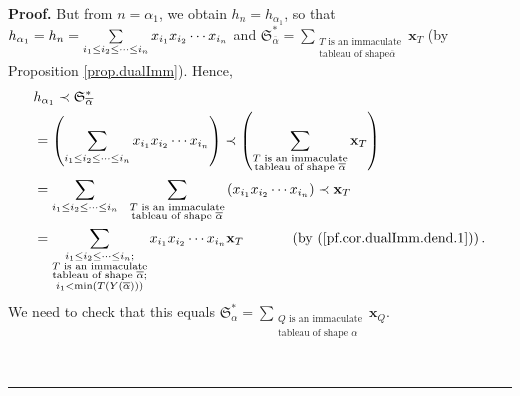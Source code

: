 \documentclass
[numbers=enddot,12pt,final,onecolumn,notitlepage,abstracton]{scrartcl}%
\theoremstyle{definition}
\newenvironment{proof}[1][Proof]{\noindent\textbf{#1.} }{\ \rule{0.5em}{0.5em}}
\newenvironment{vershort}{}{}
\let\sumnonlimits\sum
\renewcommand{\sum}{\sumnonlimits\limits}
\begin{document}
\begin{proof}
\begin{vershort}
But from $n=\alpha_{1}$, we obtain $h_{n}=h_{\alpha_{1}}$, so that
$h_{\alpha_{1}}=h_{n}=\sum\limits_{i_{1}\leq i_{2}\leq\cdots\leq i_{n}%
}x_{i_{1}}x_{i_{2}}\cdots x_{i_{n}}$ and $\mathfrak{S}_{\overline{\alpha}%
}^{\ast}=\sum_{\substack{T\text{ is an immaculate}\\\text{tableau of shape
}\overline{\alpha}}}\mathbf{x}_{T}$ (by Proposition \ref{prop.dualImm}).
Hence,%
\begin{align}
&  h_{\alpha_{1}}\left.  \prec\right.  \mathfrak{S}_{\overline{\alpha}}^{\ast
}\nonumber\\
&  =\left(  \sum\limits_{i_{1}\leq i_{2}\leq\cdots\leq i_{n}}x_{i_{1}}%
x_{i_{2}}\cdots x_{i_{n}}\right)  \left.  \prec\right.  \left(  \sum
_{\substack{T\text{ is an immaculate}\\\text{tableau of shape }\overline
{\alpha}}}\mathbf{x}_{T}\right)  \nonumber\\
&  =\sum\limits_{i_{1}\leq i_{2}\leq\cdots\leq i_{n}}\ \ \sum
_{\substack{T\text{ is an immaculate}\\\text{tableau of shape }\overline
{\alpha}}}\left(  x_{i_{1}}x_{i_{2}}\cdots x_{i_{n}}\right)  \left.
\prec\right.  \mathbf{x}_{T}\nonumber\\
&  =\sum\limits_{\substack{i_{1}\leq i_{2}\leq\cdots\leq i_{n};\\T\text{ is an
immaculate}\\\text{tableau of shape }\overline{\alpha};\\i_{1}<\min\left(
T\left(  Y\left(  \overline{\alpha}\right)  \right)  \right)  }}x_{i_{1}%
}x_{i_{2}}\cdots x_{i_{n}}\mathbf{x}_{T}\ \ \ \ \ \ \ \ \ \ \left(  \text{by
(\ref{pf.cor.dualImm.dend.1})}\right)  .\label{pf.cor.dualImm.dend.short.RHS}%
\end{align}
We need to check that this equals $\mathfrak{S}_{\alpha}^{\ast}=\sum
_{\substack{Q\text{ is an immaculate}\\\text{tableau of shape }\alpha
}}\mathbf{x}_{Q}$.
\end{vershort}


\end{proof}
\end{document}
